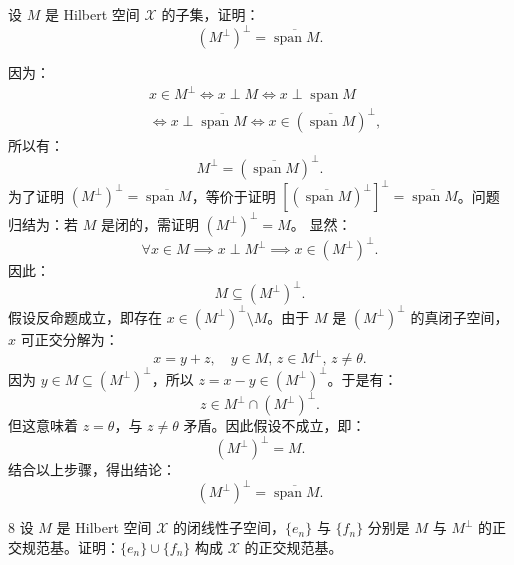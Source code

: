 \documentclass[lang=cn,newtx,10pt,scheme=chinese,thmcnt=chapter]{elegantbook}
\begin{document}
\begin{problem}
设 $M$ 是 Hilbert 空间 $\mathscr{X}$ 的子集，证明：
\[
\left(M^{\perp}\right)^{\perp} = \overline{\operatorname{span} M}.
\]
\end{problem}
\begin{solution}
因为：
\[
\begin{aligned}
    & x \in M^{\perp} \Longleftrightarrow x \perp M \Longleftrightarrow x \perp \operatorname{span} M \\
    & \Longleftrightarrow x \perp \overline{\operatorname{span} M} \Longleftrightarrow x \in (\overline{\operatorname{span} M})^{\perp},
\end{aligned}
\]
所以有：
\[
M^{\perp} = (\overline{\operatorname{span} M})^{\perp}.
\]
为了证明 $\left(M^{\perp}\right)^{\perp} = \overline{\operatorname{span} M}$，等价于证明 $\left[(\overline{\operatorname{span} M})^{\perp}\right]^{\perp} = \overline{\operatorname{span} M}$。问题归结为：若 $M$ 是闭的，需证明 $\left(M^{\perp}\right)^{\perp} = M$。
显然：
\[
\forall x \in M \implies x \perp M^{\perp} \implies x \in \left(M^{\perp}\right)^{\perp}.
\]
因此：
\[
M \subseteq \left(M^{\perp}\right)^{\perp}.
\]
假设反命题成立，即存在 $x \in \left(M^{\perp}\right)^{\perp} \setminus M$。由于 $M$ 是 $\left(M^{\perp}\right)^{\perp}$ 的真闭子空间，$x$ 可正交分解为：
\[
x = y + z, \quad y \in M, \, z \in M^{\perp}, \, z \neq \theta.
\]
因为 $y \in M \subseteq \left(M^{\perp}\right)^{\perp}$，所以 $z = x - y \in \left(M^{\perp}\right)^{\perp}$。于是有：
\[
z \in M^{\perp} \cap \left(M^{\perp}\right)^{\perp}.
\]
但这意味着 $z = \theta$，与 $z \neq \theta$ 矛盾。因此假设不成立，即：
\[
\left(M^{\perp}\right)^{\perp} = M.
\]
结合以上步骤，得出结论：
\[
\left(M^{\perp}\right)^{\perp} = \overline{\operatorname{span} M}.
\]
\end{solution}

\begin{problem}{8}
设 $M$ 是 Hilbert 空间 $\mathscr{X}$ 的闭线性子空间，$\{e_n\}$ 与 $\{f_n\}$ 分别是 $M$ 与 $M^{\perp}$ 的正交规范基。证明：$\{e_n\} \cup \{f_n\}$ 构成 $\mathscr{X}$ 的正交规范基。
\end{problem}
\end{document}
